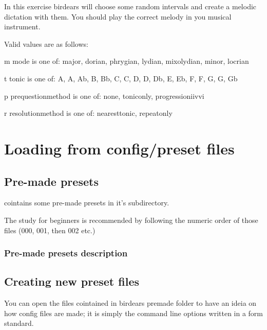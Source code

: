 \documentclass[letterpaper,10pt,english]{sphinxmanual}
\begin{document}
\begin{sphinxVerbatim}[commandchars=\\\{\}]
  In this exercise birdears will choose some random intervals and create a
  melodic dictation with them. You should play the correct melody in you
  musical instrument.

  Valid values are as follows:

  \PYGZhy{}m \PYGZlt{}mode\PYGZgt{} is one of: major, dorian, phrygian, lydian, mixolydian, minor,
  locrian

  \PYGZhy{}t \PYGZlt{}tonic\PYGZgt{} is one of: A, A\PYGZsh{}, Ab, B, Bb, C, C\PYGZsh{}, D, D\PYGZsh{}, Db, E, Eb, F, F\PYGZsh{}, G,
  G\PYGZsh{}, Gb

  \PYGZhy{}p \PYGZlt{}prequestion\PYGZus{}method\PYGZgt{} is one of: none, tonic\PYGZus{}only, progression\PYGZus{}i\PYGZus{}iv\PYGZus{}v\PYGZus{}i

  \PYGZhy{}r \PYGZlt{}resolution\PYGZus{}method\PYGZgt{} is one of: nearest\PYGZus{}tonic, repeat\PYGZus{}only
\end{sphinxVerbatim}


\section{Loading from config/preset files}
\label{\detokenize{index:loading-from-config-preset-files}}

\subsection{Pre-made presets}
\label{\detokenize{index:pre-made-presets}}
 cointains some pre-made presets in it’s 
subdirectory.

The study for beginners is recommended by following the numeric order of
those files (000, 001, then 002 etc.)


\subsubsection{Pre-made presets description}
\label{\detokenize{index:pre-made-presets-description}}


\subsection{Creating new preset files}
\label{\detokenize{index:creating-new-preset-files}}
You can open the files cointained in birdears premade 
folder to have an ideia on how config files are made; it is simply the
command line options written in a form  standard.
\end{document}
